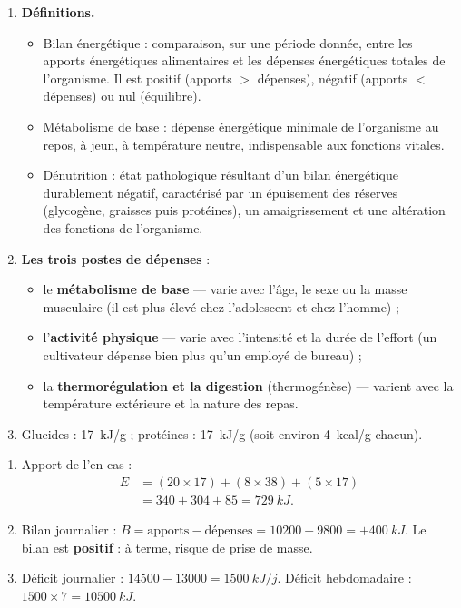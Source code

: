 \documentclass[11pt]{article}
\newcommand{\cle}[1]{{\popxbold\color{popdark}#1}}
\begin{document}
\begin{corrige}
\tcblower
\begin{enumerate}
\item \textbf{Définitions.}
\begin{itemize}
\item \cle{Bilan énergétique} : comparaison, sur une période donnée, entre les apports énergétiques alimentaires et les dépenses énergétiques totales de l'organisme. Il est positif (apports $>$ dépenses), négatif (apports $<$ dépenses) ou nul (équilibre).
\item \cle{Métabolisme de base} : dépense énergétique minimale de l'organisme au repos, à jeun, à température neutre, indispensable aux fonctions vitales.
\item \cle{Dénutrition} : état pathologique résultant d'un bilan énergétique durablement négatif, caractérisé par un épuisement des réserves (glycogène, graisses puis protéines), un amaigrissement et une altération des fonctions de l'organisme.
\end{itemize}
\item \textbf{Les trois postes de dépenses} :
\begin{itemize}
\item le \textbf{métabolisme de base} — varie avec l'âge, le sexe ou la masse musculaire (il est plus élevé chez l'adolescent et chez l'homme) ;
\item l'\textbf{activité physique} — varie avec l'intensité et la durée de l'effort (un cultivateur dépense bien plus qu'un employé de bureau) ;
\item la \textbf{thermorégulation et la digestion} (thermogénèse) — varient avec la température extérieure et la nature des repas.
\end{itemize}
\item Glucides : \SI{17}{kJ/g} ; protéines : \SI{17}{kJ/g} (soit environ \SI{4}{kcal/g} chacun).
\end{enumerate}
\end{corrige}

\begin{corrige}
\tcblower
\begin{enumerate}
\item Apport de l'en-cas :
\begin{align*}
E &= (20 \times 17) + (8 \times 38) + (5 \times 17)\\
&= 340 + 304 + 85 = \SI{729}{kJ}.
\end{align*}
\item Bilan journalier : $B = \text{apports} - \text{dépenses} = 10200 - 9800 = +\SI{400}{kJ}$. Le bilan est \textbf{positif} : à terme, risque de prise de masse.
\item Déficit journalier : $14500 - 13000 = \SI{1500}{kJ/j}$. Déficit hebdomadaire : $1500 \times 7 = \SI{10500}{kJ}$.
\end{enumerate}
\end{corrige}
\end{document}
